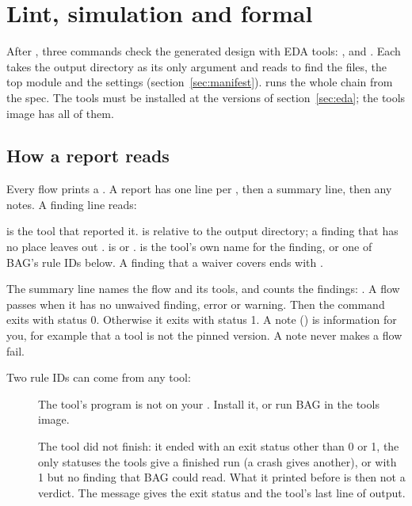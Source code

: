 \chapter{Lint, simulation and formal}
\label{ch:flows}

After , three commands check the generated design with EDA tools:
,  and . Each takes the output directory as
its only argument and reads  to find the files, the top module
and the settings (section~\ref{sec:manifest}).  runs the whole chain from
the spec. The tools must be installed at the versions of section~\ref{sec:eda}; the
tools image has all of them.

\section{How a report reads}
\label{sec:report}

Every flow prints a . A report has one line per , then a
summary line, then any notes. A finding line reads:

\begin{center}
\end{center}

 is the tool that reported it.  is relative to the output
directory; a finding that has no place leaves out .  is
 or .  is the tool's own name for the finding, or
one of BAG's rule IDs below. A finding that a waiver covers ends with
.

The summary line names the flow and its tools, and counts the findings:
. A flow passes when it has no unwaived finding,
error or warning. Then the command exits with status 0. Otherwise it exits with status
1. A note () is information for you, for example that a tool is not the
pinned version. A note never makes a flow fail.

Two rule IDs can come from any tool:

\begin{description}
\item[] The tool's program is not on your . Install it,
  or run BAG in the tools image.
\item[] The tool did not finish: it ended with an exit status other
  than 0 or 1, the only statuses the tools give a finished run (a crash gives another), or
  with 1 but no finding that BAG could read. What it printed before is then not a verdict. The message gives the exit
  status and the tool's last line of output.
\end{description}

